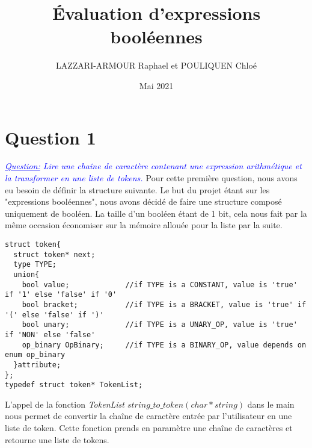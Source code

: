 \documentclass{article}
\title{Évaluation d’expressions booléennes}
\author{LAZZARI-ARMOUR Raphael et POULIQUEN Chloé}
\date{Mai 2021}
\begin{document}
\maketitle

\section*{Question 1}
\textit{
\textcolor{blue}{
\underline{Question:}
 Lire une chaîne de caractère contenant une expression arithmétique et la transformer en une liste de tokens.
}
}
\newline\newline
Pour cette première question, nous avons eu besoin de définir la structure suivante. Le but du projet étant sur les "expressions booléennes", nous avons décidé de faire une structure composé uniquement de booléen. La taille d'un booléen étant de 1 bit, cela nous fait par la même occasion économiser sur la mémoire allouée pour la liste par la suite. 

\begin{verbatim}
struct token{
  struct token* next;
  type TYPE;
  union{
    bool value;             //if TYPE is a CONSTANT, value is 'true' if '1' else 'false' if '0'
    bool bracket;           //if TYPE is a BRACKET, value is 'true' if '(' else 'false' if ')'
    bool unary;             //if TYPE is a UNARY_OP, value is 'true' if 'NON' else 'false'
    op_binary OpBinary;     //if TYPE is a BINARY_OP, value depends on enum op_binary
  }attribute;
};
typedef struct token* TokenList;
\end{verbatim}

L'appel de la fonction \textit{TokenList $string\_to\_token(char* string)$} dans le main nous permet de convertir la chaîne de caractère entrée par l'utilisateur en une liste de token. Cette fonction prends en paramètre une chaîne de caractères et retourne une liste de tokens. 
\end{document}
